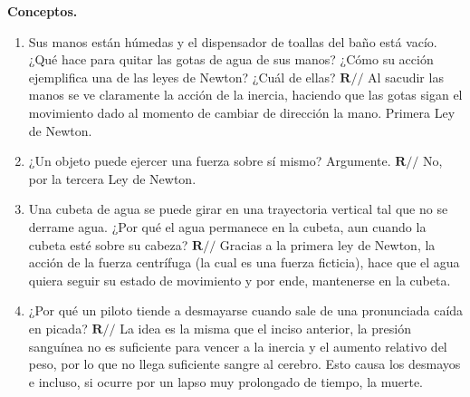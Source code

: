 \begin{mdframed}[style=warning]
	\begin{ejercicio}
		\textbf{Conceptos.}
		\begin{enumerate}
			\item Sus manos están húmedas y el dispensador de toallas del baño está vacío. ¿Qué hace para quitar las gotas de agua de sus manos? ¿Cómo su acción ejemplifica una de las leyes de Newton? ¿Cuál de ellas?
			$\mathbf{R//}$ Al sacudir las manos se ve claramente la acción de la inercia, haciendo que las gotas sigan el movimiento dado al momento de cambiar de dirección la mano. Primera Ley de Newton.
			\item ¿Un objeto puede ejercer una fuerza sobre sí mismo? Argumente. $\mathbf{R//}$ No, por la tercera Ley de Newton.
			\item Una cubeta de agua se puede girar en una trayectoria vertical tal que no se derrame agua. ¿Por qué el agua permanece en la cubeta, aun cuando la cubeta esté sobre su cabeza? $\mathbf{R//}$ Gracias a la primera ley de Newton, la acción de la fuerza centrífuga (la cual es una fuerza ficticia), hace que el agua quiera seguir su estado de movimiento y por ende, mantenerse en la cubeta.
			\item ¿Por qué un piloto tiende a desmayarse cuando sale de una pronunciada caída en picada? $\mathbf{R//}$ La idea es la misma que el inciso anterior, la presión sanguínea no es suficiente para vencer a la inercia y el aumento relativo del peso, por lo que no llega suficiente sangre al cerebro. Esto causa los desmayos e incluso, si ocurre por un lapso muy prolongado de tiempo, la muerte.
		\end{enumerate}
	\end{ejercicio}
\end{mdframed}





